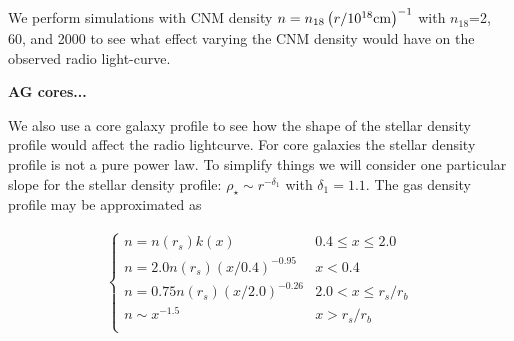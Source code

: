 \documentclass[usenatbib,fleqn]{mnras}
\begin{document}
We perform simulations with CNM density $n=n_{18} \left(r/10^{18} {\rm
  cm}\right)^{-1}$ with $n_{18}$=2, 60, and 2000 to see what effect
varying the CNM density would have on the observed radio light-curve.






{\bf AG cores...}

We also use a core galaxy profile to see how the shape of the stellar
density profile would affect the radio lightcurve. For core galaxies
the stellar density profile is not a pure power law. To simplify
things we will consider one particular slope for the stellar density
profile: $\rho_\star\sim r^{-\delta_1}$ with $\delta_1=1.1$. The gas
density profile may be approximated as

\begin{align}
\begin{cases}
n=n(r_s) k(x) & 0.4 \leq x\leq 2.0\\
n = 2.0 n(r_s) (x/0.4)^{-0.95} & x < 0.4\\
n = 0.75 n(r_s) (x/2.0)^{-0.26} & 2.0< x \leq r_s/r_b\\
n \sim x^{-1.5} & x>r_s/r_b\\
\end{cases}
\label{eq:cores}
\end{align}
\end{document}
